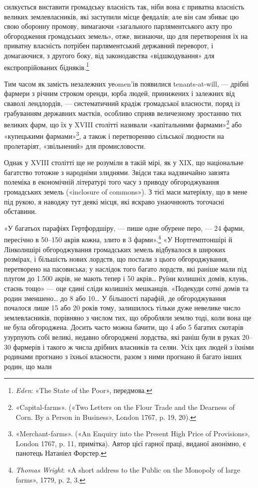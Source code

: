 \parcont{}  %
силкується виставити громадську власність так, ніби вона є
приватна власність великих землевласників, які заступили місце
февдалів; але він сам збиває цю свою оборонну промову, вимагаючи
«загального парляментського акту про обгородження громадських
земель», отже, визнаючи, що для перетворення їх на
приватну власність потрібен парляментський державний переворот,
і домагаючися, з другого боку, від законодавства «відшкодування»
для експропрійованих бідняків.\footnote{
\emph{Eden}: «The State of the Poor», передмова.
}

Тим часом як замість незалежних уеomen’ів появилися tenants-at-will,
— дрібні фармери з річним строком оренди, юрба
людей, принижених і залежних від сваволі лендлордів, — систематичний
крадіж громадської власности, поряд із грабуванням
державних маєтків, особливо сприяв величезному зростанню
тих великих фарм, що їх у XVIII столітті називали «капітальними
фармами»\footnote{
«Capital-farms». («Two Letters on the Flour Trade and the Dearness
of Corn. By a Person in Business», London 1767, p. 19, 20).
} або «купецькими фармами»\footnote{
«Merchant-farms». («An Enquiry into the Present High Price
of Provisions», London 1767, p. 11, примітка). Автор цієї гарної праці,
виданої анонімно, є панотець Натаніел Форстер.
}, а також і перетворенню
сільської людности на пролетаріят, «звільнений» для
промисловости.

Однак у XVIII столітті ще не розуміли в такій мірі, як у
XIX, що національне багатство тотожне з народніми злиднями.
Звідси така надзвичайно завзята полеміка в економічній літературі
того часу з приводу обгороджування громадських земель
(«inclosure of commons»). З тієї маси матеріялу, що в мене під
рукою, я наводжу тут деякі місця, які яскраво унаочнюють тогочасні
обставини.

«У багатьох парафіях Гертфордшіру, — пише одне обурене
перо, — 24 фарми, пересічно в 50--150 акрів кожна, злито в
3 фарми».\footnote{
\emph{Thomas Wright}: «A short address to the Public on the Monopoly
of large farms», 1779, p. 2, 3.
} «У Нортгемптоншірі й Лінколншірі обгороджування
громадських земель відбувалося в широких розмірах, і
більшість нових лордств, що постали з цього обгороджування,
перетворено на пасовиська; у наслідок того багато лордств, які
раніше мали під плугом до \num{1.500} акрів, не мають тепер і 50 акрів\dots{}
Руїни колишніх домів, клунь, стаєнь тощо» — оце єдині
сліди колишніх мешканців. «Подекуди сотні домів та родин
зменшено\dots{} до 8 або 10\dots{} У більшості парафій, де обгороджування
почалося лише 15 або 20 років тому, залишилось тільки дуже
невелике число землевласників, порівняно з числом тих, що
обробляли землю тоді, коли вона ще не була обгороджена. Досить
часто можна бачити, що 4 або 5 багатих скотарів узурпують
собі великі, недавно обгороджені лордства, які раніш були в
руках 20--30 фармерів і такого ж числа дрібних власників та
селян. Усіх цих людей з їхніми родинами прогнано з їхньої
власности, разом з ними прогнано й багато інших родин, що мали
\parbreak{}  %
